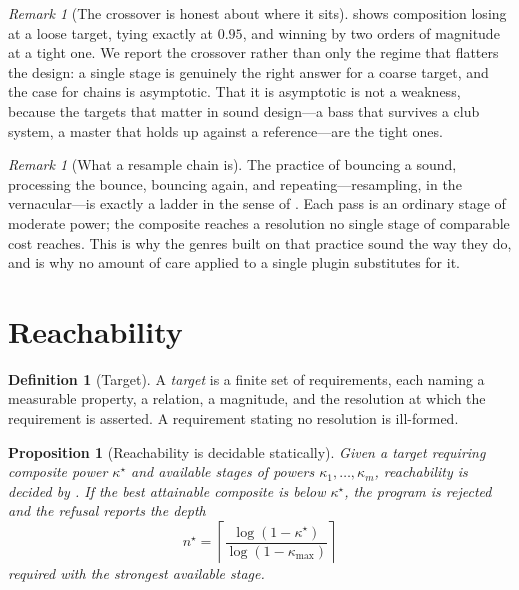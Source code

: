 \documentclass[11pt,twocolumn,a4paper]{article}
\newtheorem{proposition}[theorem]{Proposition}
\theoremstyle{definition}
\newtheorem{definition}[theorem]{Definition}
\theoremstyle{remark}
\newtheorem{remark}[theorem]{Remark}
\newcommand{\pot}{\kappa}
\begin{document}
\begin{remark}[The crossover is honest about where it sits]
\label{rem:crossover}
 shows composition losing at a loose target, tying exactly at
$0.95$, and winning by two orders of magnitude at a tight one. We report the
crossover rather than only the regime that flatters the design: a single stage is
genuinely the right answer for a coarse target, and the case for chains is
asymptotic. That it is asymptotic is not a weakness, because the targets that
matter in sound design---a bass that survives a club system, a master that holds
up against a reference---are the tight ones.
\end{remark}

\begin{remark}[What a resample chain is]
\label{rem:resample}
The practice of bouncing a sound, processing the bounce, bouncing again, and
repeating---resampling, in the vernacular---is exactly a ladder in the sense of
. Each pass is an ordinary stage of moderate power; the composite
reaches a resolution no single stage of comparable cost reaches. This is why the
genres built on that practice sound the way they do, and  is why
no amount of care applied to a single plugin substitutes for it.
\end{remark}

\section{Reachability}
\label{sec:reachability}

\begin{definition}[Target]
\label{def:target}
A \emph{target} is a finite set of requirements, each naming a measurable
property, a relation, a magnitude, and the resolution at which the requirement is
asserted. A requirement stating no resolution is ill-formed.
\end{definition}

\begin{proposition}[Reachability is decidable statically]
\label{prop:reach}
Given a target requiring composite power $\pot^{\star}$ and available stages of
powers $\pot_1,\dots,\pot_m$, reachability is decided by . If
the best attainable composite is below $\pot^{\star}$, the program is rejected and
the refusal reports the depth
\[
  n^{\star} = \left\lceil
    \frac{\log(1-\pot^{\star})}{\log(1-\pot_{\max})}
  \right\rceil
\]
required with the strongest available stage.
\end{proposition}
\end{document}

